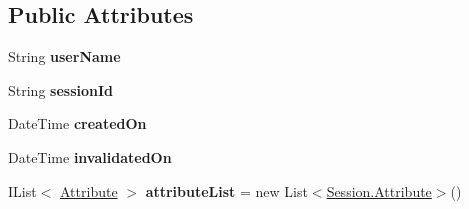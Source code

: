 \subsection*{Public Attributes}
\begin{DoxyCompactItemize}
\item 
\hypertarget{classcom_1_1shephertz_1_1app42_1_1paas_1_1sdk_1_1windows_1_1session_1_1_session_a2209a31c2f7aeec1747f8719bf85b6e4}{String {\bfseries user\+Name}}\label{classcom_1_1shephertz_1_1app42_1_1paas_1_1sdk_1_1windows_1_1session_1_1_session_a2209a31c2f7aeec1747f8719bf85b6e4}

\item 
\hypertarget{classcom_1_1shephertz_1_1app42_1_1paas_1_1sdk_1_1windows_1_1session_1_1_session_a490c50e3f431406350fd52f3911a458f}{String {\bfseries session\+Id}}\label{classcom_1_1shephertz_1_1app42_1_1paas_1_1sdk_1_1windows_1_1session_1_1_session_a490c50e3f431406350fd52f3911a458f}

\item 
\hypertarget{classcom_1_1shephertz_1_1app42_1_1paas_1_1sdk_1_1windows_1_1session_1_1_session_a28319456257682b7d4505b8b4579c5a1}{Date\+Time {\bfseries created\+On}}\label{classcom_1_1shephertz_1_1app42_1_1paas_1_1sdk_1_1windows_1_1session_1_1_session_a28319456257682b7d4505b8b4579c5a1}

\item 
\hypertarget{classcom_1_1shephertz_1_1app42_1_1paas_1_1sdk_1_1windows_1_1session_1_1_session_a10ed1ac56303a014b92190c856fb3dba}{Date\+Time {\bfseries invalidated\+On}}\label{classcom_1_1shephertz_1_1app42_1_1paas_1_1sdk_1_1windows_1_1session_1_1_session_a10ed1ac56303a014b92190c856fb3dba}

\item 
\hypertarget{classcom_1_1shephertz_1_1app42_1_1paas_1_1sdk_1_1windows_1_1session_1_1_session_a9fd81adf0856b9f977e165ffc111902f}{I\+List$<$ \hyperlink{classcom_1_1shephertz_1_1app42_1_1paas_1_1sdk_1_1windows_1_1session_1_1_session_1_1_attribute}{Attribute} $>$ {\bfseries attribute\+List} = new List$<$\hyperlink{classcom_1_1shephertz_1_1app42_1_1paas_1_1sdk_1_1windows_1_1session_1_1_session_1_1_attribute}{Session.\+Attribute}$>$()}\label{classcom_1_1shephertz_1_1app42_1_1paas_1_1sdk_1_1windows_1_1session_1_1_session_a9fd81adf0856b9f977e165ffc111902f}

\end{DoxyCompactItemize}
